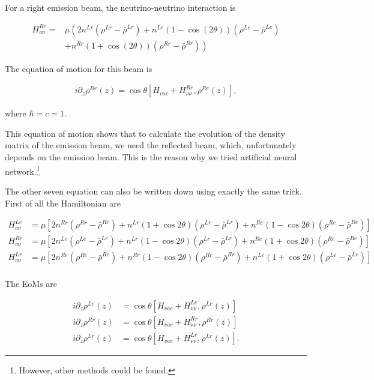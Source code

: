 \documentclass{tufte-handout}
\begin{document}
For a right emission beam, the neutrino-neutrino interaction is



\begin{align}
H_{\nu\nu}^{Re} =& \mu \left( 2 n^{Lr} (\rho^{Lr} -\bar\rho^{Lr}) +  n^{Le}(1-\cos(2\theta) ) (\rho^{Le} -\bar\rho^{Le}) \right. \nonumber \\
& \left. + n^{Rr} (1+\cos(2\theta))(\rho^{Rr} - \bar\rho^{Rr})  \right) 
\end{align}

The equation of motion for this beam is

\begin{align}
i \partial_z \rho^{Re}(z)  = \cos\theta \left[ H_{vac} + H_{\nu\nu}^{Re} ,  \rho^{Re}(z)  \right],
\end{align}

where $\hbar= c =1$.

This equation of motion shows that to calculate the evolution of the density matrix of the emission beam, we need the reflected beam, which, unfortunately depends on the emission beam. This is the reason why we tried artificial neural network.\footnote{However, other methods could be found.}


The other seven equation can also be written down using exactly the same trick. First of all the Hamiltonian are

\begin{align*}
H_{\nu\nu}^{Le} & = \mu \left[ 2 n^{Rr}(\rho^{Rr} - \bar \rho^{Rr}) + n^{Lr}(1+\cos 2\theta )( \rho^{Lr} - \bar \rho^{Lr} )  +  n^{Re} (1-\cos 2\theta) (\rho^{Re} - \bar \rho^{Re})\right] \\
H_{\nu\nu}^{Rr}& = \mu\left[ 2 n^{Le}(\rho^{Le} - \bar \rho^{Le}) + n^{Lr} (1-\cos 2\theta)(\rho^{Lr} - \bar\rho^{Lr}) + n^{Re}(1+\cos 2\theta) (\rho^{Re} - \bar \rho^{Re}) \right] \\
H_{\nu\nu}^{Lr}& = \mu \left[ 2n^{Re}(\rho^{Re}-\bar\rho^{Re}) + n^{Rr} (1-\cos 2\theta) (\rho^{Rr} - \bar \rho^{Rr}) + n^{Le}(1+\cos 2\theta )  (\rho^{Le} - \bar \rho^{Le} ) \right]\\
\end{align*}

The EoMs are


\begin{align}
i\partial_z \rho^{Le}(z) &= \cos\theta \left[ H_{vac} + H_{\nu\nu}^{Le}, \rho^{Le}(z) \right] \\
i\partial_z \rho^{Rr}(z) &= \cos\theta \left[ H_{vac} + H_{\nu\nu}^{Rr}, \rho^{Rr}(z) \right] \\
i\partial_z \rho^{Lr}(z) &= \cos\theta \left[ H_{vac} + H_{\nu\nu}^{Lr}, \rho^{Lr}(z) \right].
\end{align}
\end{document}
